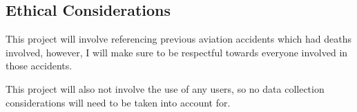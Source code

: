 \documentclass[a4paper]{article}
\begin{document}
\subsection{Ethical Considerations}
This project will involve referencing previous aviation
accidents which had deaths involved, however, I will make
sure to be respectful towards everyone involved in
those accidents.

This project will also not involve the use of any users,
so no data collection considerations will need to be taken
into account for.
\clearpage


\nocite{*}
\printbibliography[heading=bibnumbered]
\end{document}
